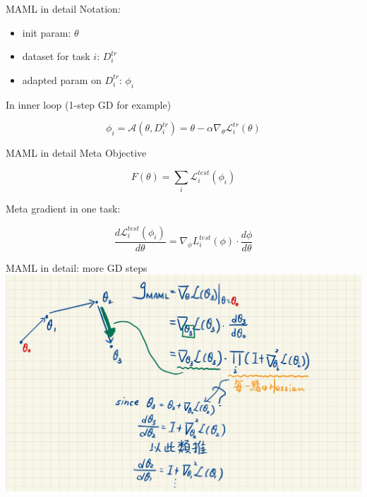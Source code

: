 \documentclass{beamer}
\begin{document}
\begin{frame}[t]{MAML in detail}
  Notation:
  \begin{itemize}
    \item init param: $\theta$
    \item dataset for task $i$: $D^{tr}_i$
    \item adapted param on $D^{tr}_i$: $\phi_i$
  \end{itemize}

  In inner loop (1-step GD for example)

  \begin{equation*}
    \phi_i = \mathcal{A}(\theta, D^{tr}_i) = \theta - \alpha \nabla_\theta \mathcal{L}^{tr}_i(\theta)
  \end{equation*}

\end{frame}

\begin{frame}[t]{MAML in detail}
  Meta Objective

  \begin{equation*}
    F(\theta) = \sum_i \mathcal{L}^{test}_i(\phi_i)
  \end{equation*}

  Meta gradient in one task:

  \begin{equation*}
    \frac{d \mathcal{L}^{test}_i(\phi_i)}{d \theta} = \nabla_\phi L^{test}_i (\phi) \cdot \frac{d \phi}{d \theta}
  \end{equation*}
\end{frame}

\begin{frame}[t]{MAML in detail: more GD steps}
  \center \includegraphics[width=\textwidth]{fig/iMAML-more-step.png}
\end{frame}
\end{document}
